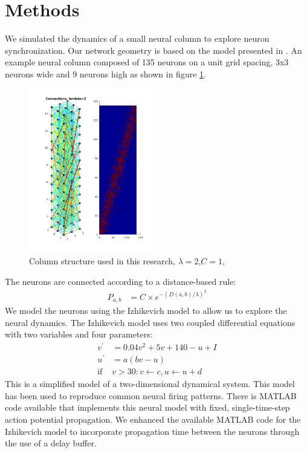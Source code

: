\documentclass[a4paper,11pt]{article}
\begin{document}
\section{Methods}
We simulated the dynamics of a small neural column to explore neuron synchronization.
Our network geometry is based on the model presented in \cite{markram1998}.
An example neural column composed of 135 neurons on a unit grid spacing, 3x3 neurons wide and 9 neurons high as shown in figure \ref{fig:column_structure}.
\begin{figure}[ht]
 \caption{Column structure used in this research, $\lambda=2$,$C=1$,}
 \label{fig:column_structure}
 \centering
   \includegraphics[width=0.48\textwidth]{fig/lambda2}
\end{figure}
The neurons are connected according to a distance-based rule:
\begin{align}\label{eq:connectivity}
 P_{a,b} &= C \times e^{-(D(a,b)/\lambda)^2}
\end{align}
We model the neurons using the Izhikevich model \cite{izhikevich2003} to allow us to explore the neural dynamics.
The Izhikevich model uses two coupled differential equations with two variables and four parameters:
\begin{align}
 v^\prime &= 0.04v^2+5v+140-u+I\\
 u^\prime &= a(bv-u)\\
 \text{if } &v>30: v\leftarrow c, u\leftarrow u+d
\end{align}
This is a simplified model of a two-dimensional dynamical system.
This model has been used to reproduce common neural firing patterns.
There is MATLAB code available that implements this neural model with fixed, single-time-step action potential propagation.
We enhanced the available MATLAB code for the Izhikevich model to incorporate propagation time between the neurons through the use of a delay buffer.
\end{document}
